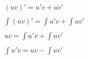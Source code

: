 \begin{gather*}
    (uv)' = u'v + uv' \\ \\
    \int (uv)' = \int u'v + \int uv' \\ \\
    uv = \int u'v + \int uv' \\ \\
    \boxed{\int u'v = uv - \int uv'} \\
\end{gather*}